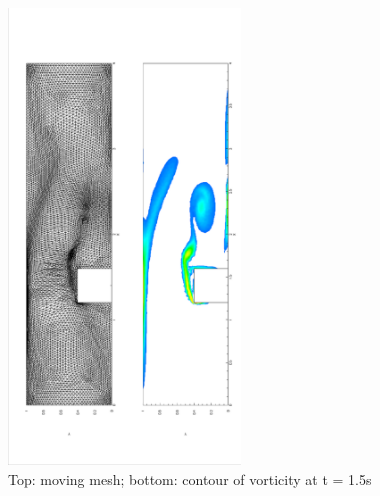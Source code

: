       \begin{figure}[!htbp]
        \centering
        \includegraphics[width = 0.55\textwidth, angle = -90]{picture/first/step_flow_data/mesh_t_1_5s.eps}
        \caption{\small Top: moving mesh; bottom: contour of vorticity
          at t = 1.5s}
        \label{fig::step_flow_1_5s}
      \end{figure}

